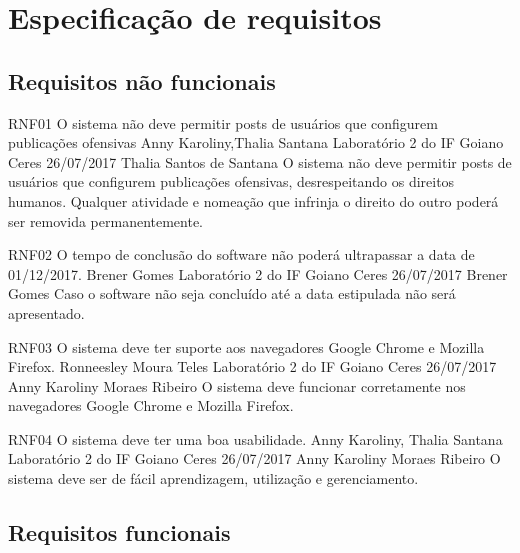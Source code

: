 \chapter{Especificação de requisitos}
 	
 \section{Requisitos não funcionais}
 
 \requisitoNaoFuncional
 {RNF01}
 {O sistema não deve permitir posts de usuários que configurem publicações ofensivas}
 {Anny Karoliny,Thalia Santana}
 {Laboratório 2 do IF Goiano Ceres}
 {26/07/2017}
 {Thalia Santos de Santana}
 {O sistema não deve permitir posts de usuários que configurem publicações ofensivas, desrespeitando os direitos humanos. Qualquer atividade e nomeação que infrinja o direito do outro poderá ser removida permanentemente.
 }
 
 \requisitoNaoFuncional
 {RNF02}
 {O tempo de conclusão do software não poderá ultrapassar a data de 01/12/2017.}
 {Brener Gomes}
 {Laboratório 2 do IF Goiano Ceres}
 {26/07/2017}
 {Brener Gomes}
 {Caso o software não seja concluído até a data estipulada não será apresentado.
 }
 
 \requisitoNaoFuncional
 {RNF03}
 {O sistema  deve ter suporte aos navegadores Google Chrome e Mozilla Firefox.}
 {Ronneesley Moura Teles}
 {Laboratório 2 do IF Goiano Ceres}
 {26/07/2017}
 {Anny Karoliny Moraes Ribeiro}
 {O sistema deve funcionar corretamente nos navegadores Google Chrome e Mozilla Firefox.
 }
 
 \requisitoNaoFuncional
 {RNF04}
 {O sistema deve ter uma boa usabilidade.}
 {Anny Karoliny, Thalia Santana}
 {Laboratório 2 do IF Goiano Ceres}
 {26/07/2017}
 {Anny Karoliny Moraes Ribeiro}
 {O sistema deve ser de fácil aprendizagem, utilização e gerenciamento.
 }


 \section{Requisitos funcionais}
 	
